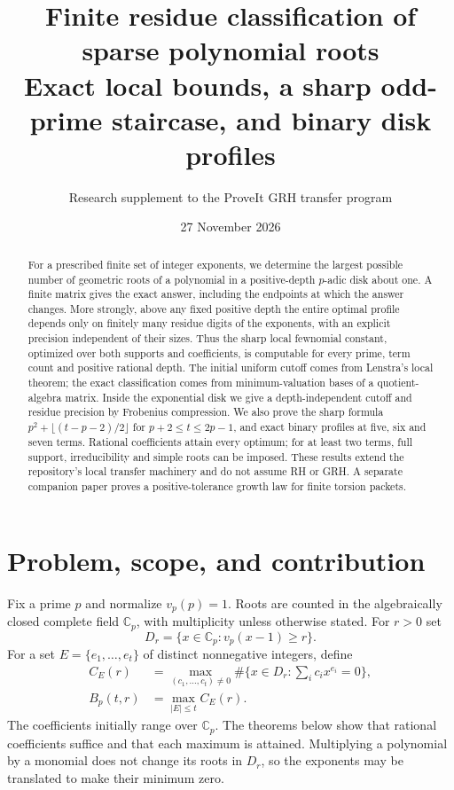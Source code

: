 \documentclass[11pt,letterpaper]{article}
\title{\color{ink}Finite residue classification of sparse polynomial roots\\
\large Exact local bounds, a sharp odd-prime staircase, and binary disk profiles}
\author{Research supplement to the ProveIt GRH transfer program}
\date{27 November 2026}
\theoremstyle{definition}\newtheorem{definition}[theorem]{Definition}
\theoremstyle{remark}\newtheorem{remark}[theorem]{Remark}
\newcommand{\Cp}{\mathbb C_p}
\newcommand{\vp}{v_p}
\begin{document}
\maketitle
\begin{abstract}
For a prescribed finite set of integer exponents, we determine the largest
possible number of geometric roots of a polynomial in a positive-depth
$p$-adic disk about one. A finite matrix gives the exact answer, including
the endpoints at which the answer changes. More strongly, above any fixed
positive depth the entire optimal profile depends only on finitely many
residue digits of the exponents, with an explicit precision independent of
their sizes. Thus the sharp local fewnomial constant, optimized over both
supports and coefficients, is computable for every prime, term count and
positive rational depth. The initial uniform cutoff comes from Lenstra's
local theorem; the exact classification comes from minimum-valuation bases
of a quotient-algebra matrix. Inside the exponential disk we give a
depth-independent cutoff and residue precision by Frobenius compression.
We also prove the sharp formula
$p^2+\lfloor(t-p-2)/2\rfloor$ for $p+2\le t\le2p-1$, and exact binary
profiles at five, six and seven terms. Rational coefficients attain every
optimum; for at least two terms, full support, irreducibility and simple
roots can be imposed.
These results extend the repository's local transfer machinery and do not
assume RH or GRH. A separate companion paper proves a positive-tolerance
growth law for finite torsion packets.
\end{abstract}
{\small\tableofcontents}

\section{Problem, scope, and contribution}
Fix a prime $p$ and normalize $\vp(p)=1$. Roots are counted in the
algebraically closed complete field $\Cp$, with multiplicity unless
otherwise stated. For $r>0$ set
\[
 D_r=\{x\in\Cp:\vp(x-1)\ge r\}.
\]
For a set $E=\{e_1,\ldots,e_t\}$ of distinct nonnegative integers, define
\begin{align*}
 C_E(r)&=\max_{(c_1,\ldots,c_t)\ne0}
 \#\{x\in D_r:\textstyle\sum_i c_i x^{e_i}=0\},\\
 B_p(t,r)&=\max_{|E|\le t}C_E(r).
\end{align*}
The coefficients initially range over $\Cp$. The theorems below show
that rational coefficients suffice and that each maximum is attained.
Multiplying a polynomial by a monomial does not change its roots in
$D_r$, so the exponents may be translated to make their minimum zero.
\end{document}
